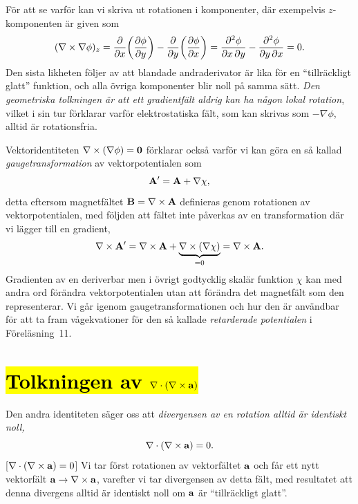 F{\"o}r att se varf{\"o}r kan vi skriva ut rotationen i komponenter, d{\"a}r
exempelvis $z$-komponenten {\"a}r given som
$$
   (\nabla\times\nabla\phi)_z
      ={{\partial}\over{\partial x}}
          \bigg({{\partial\phi}\over{\partial y}}\bigg)
          -{{\partial}\over{\partial y}}
               \bigg({{\partial\phi}\over{\partial x}}\bigg)
      ={{\partial^2\phi}\over{\partial x\,\partial y}}
        -{{\partial^2\phi}\over{\partial y\,\partial x}}
      =0.
$$
Den sista likheten f{\"o}ljer av att blandade andraderivator {\"a}r lika
f{\"o}r en ``tillr{\"a}ckligt glatt'' funktion, och alla {\"o}vriga komponenter
blir noll p{\aa} samma s{\"a}tt. {\it Den geometriska tolkningen {\"a}r att
ett gradientf{\"a}lt aldrig kan ha n{\aa}gon lokal rotation}, vilket i sin tur
f{\"o}rklarar varf{\"o}r elektrostatiska f{\"a}lt, som kan skrivas som
$-\nabla\phi$, alltid {\"a}r rotationsfria.

Vektoridentiteten $\nabla\times(\nabla\phi)={\bf 0}$ f{\"o}rklarar ocks{\aa}
varf{\"o}r vi kan g{\"o}ra en s{\aa} kallad {\it gaugetransformation} av
vektorpotentialen som
$$
  {\bf A}'={\bf A}+\nabla\chi,
$$
detta eftersom magnetf{\"a}ltet ${\bf B}=\nabla\times{\bf A}$ definieras genom
rotationen av vektorpotentialen, med f{\"o}ljden att f{\"a}ltet inte
p{\aa}verkas av en transformation d{\"a}r vi l{\"a}gger till en gradient,
$$
  \nabla\times{\bf A}'
    =\nabla\times{\bf A}+\underbrace{\nabla\times(\nabla\chi)}_{=0}
    =\nabla\times{\bf A}.
$$
Gradienten av en deriverbar men i {\"o}vrigt godtycklig skal{\"a}r funktion
$\chi$ kan med andra ord f{\"o}r{\"a}ndra vektorpotentialen utan att
f{\"o}r{\"a}ndra det magnetf{\"a}lt som den representerar. Vi g{\aa}r igenom
gaugetransformationen och hur den {\"a}r anv{\"a}ndbar f{\"o}r att ta fram
v{\aa}gekvationer f{\"o}r den s{\aa} kallade {\it retarderade potentialen}
i F{\"o}rel{\"a}sning~11.

\section{{\hl{Tolkningen av $\nabla\cdot(\nabla\times{\bf a})$}}}
Den andra identiteten s{\"a}ger oss att {\it divergensen av en rotation alltid
{\"a}r identiskt noll,}
$$
  \nabla\cdot(\nabla\times{\bf a})=0.
$$[$\nabla\cdot(\nabla\times{\bf a})=0$]
Vi tar f{\"o}rst rotationen av vektorf{\"a}ltet ${\bf a}$ och f{\aa}r ett
nytt vektorf{\"a}lt ${\bf a}\rightarrow\nabla\times{\bf a}$, varefter vi tar
divergensen av detta f{\"a}lt, med resultatet att denna divergens alltid {\"a}r
identiskt noll om ${\bf a}$ {\"a}r ``tillr{\"a}ckligt glatt''.

